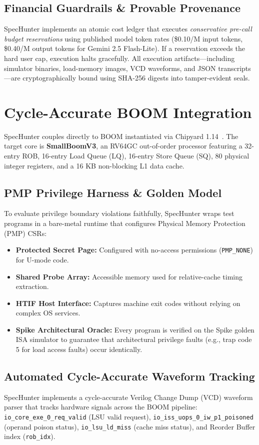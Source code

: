 \documentclass[conference,10pt]{IEEEtran}
\begin{document}
\subsection{Financial Guardrails \& Provable Provenance}
SpecHunter implements an atomic cost ledger that executes \textit{conservative pre-call budget reservations} using published model token rates (\$0.10/M input tokens, \$0.40/M output tokens for Gemini 2.5 Flash-Lite). If a reservation exceeds the hard user cap, execution halts gracefully. All execution artifacts---including simulator binaries, load-memory images, VCD waveforms, and JSON transcripts---are cryptographically bound using SHA-256 digests into tamper-evident seals.

\section{Cycle-Accurate BOOM Integration}
SpecHunter couples directly to BOOM instantiated via Chipyard 1.14~\cite{chipyard}. The target core is \textbf{SmallBoomV3}, an RV64GC out-of-order processor featuring a 32-entry ROB, 16-entry Load Queue (LQ), 16-entry Store Queue (SQ), 80 physical integer registers, and a 16 KB non-blocking L1 data cache.

\subsection{PMP Privilege Harness \& Golden Model}
To evaluate privilege boundary violations faithfully, SpecHunter wraps test programs in a bare-metal runtime that configures Physical Memory Protection (PMP) CSRs:
\begin{itemize}
    \item \textbf{Protected Secret Page:} Configured with no-access permissions (\texttt{PMP\_NONE}) for U-mode code.
    \item \textbf{Shared Probe Array:} Accessible memory used for relative-cache timing extraction.
    \item \textbf{HTIF Host Interface:} Captures machine exit codes without relying on complex OS services.
    \item \textbf{Spike Architectural Oracle:} Every program is verified on the Spike golden ISA simulator to guarantee that architectural privilege faults (e.g., trap code 5 for load access faults) occur identically.
\end{itemize}

\subsection{Automated Cycle-Accurate Waveform Tracking}
SpecHunter implements a cycle-accurate Verilog Change Dump (VCD) waveform parser that tracks hardware signals across the BOOM pipeline: \texttt{io\_core\_exe\_0\_req\_valid} (LSU valid request), \texttt{io\_iss\_uops\_0\_iw\_p1\_poisoned} (operand poison status), \texttt{io\_lsu\_ld\_miss} (cache miss status), and Reorder Buffer index (\texttt{rob\_idx}).
\end{document}
